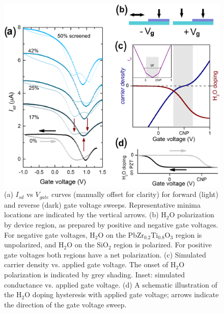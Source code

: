 \documentclass[edeposit,fullpage,draftthesis]{uiucthesis2009}
\begin{document}
\begin{figure}
  \centering
  \includegraphics[width=.8\textwidth]{images/resultsanddiscussion/pztpaper/figure3}

  \caption[Polariztion induced hysteresis in I-V curves on graphene-ferroelectric pn junctions]{
   (a) $I_{sd}$ vs $V_{gate}$ curves (manually offset for clarity) for forward (light) and reverse (dark) gate voltage sweeps. Representative minima locations are indicated by the vertical arrows.
   (b) H$_2$O polarization by device region, as prepared by positive and negative gate voltages. For negative gate voltages, H$_2$O on the PbZr$_{0.2}$Ti$_{0.8}$O$_3$ region is unpolarized, and H$_2$O on the SiO$_2$ region is polarized. For positive gate voltages both regions have a net polarization.
   (c) Simulated carrier density vs. applied gate voltage. The onset of H$_2$O polarization is indicated by grey shading. Inset: simulated conductance vs. applied gate voltage.
   (d) A schematic illustration of the H$_2$O doping hysteresis with applied gate voltage; arrows indicate the direction of the gate voltage sweep.
  }
  \label{fig:doping_dynamics}
\end{figure}
\end{document}
